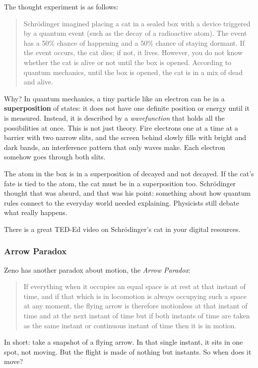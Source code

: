 The thought experiment is as follows:
\begin{quote}
    Schrödinger imagined placing a cat in a sealed box with a device triggered by a quantum event (such as the decay of a radioactive atom). The event has a 50\% chance of happening and a 50\% chance of staying dormant. If the event occurs, the cat dies; if not, it lives. However, you do not know whether the cat is alive or not until the box is opened. According to quantum mechanics, until the box is opened, the cat is in a
mix of dead and alive.
\end{quote}
Why? In quantum mechanics, a tiny particle like an electron can be in a
\textbf{superposition} of states: it does not have one definite position
or energy until it is measured. Instead, it is described by a
\emph{wavefunction} that holds all the possibilities at once. This is not
just theory. Fire electrons one at a time at a barrier with two narrow
slits, and the screen behind slowly fills with bright and dark bands, an
interference pattern that only waves make. Each electron somehow goes
through both slits.

The atom in the box is in a superposition of decayed and not decayed. If
the cat's fate is tied to the atom, the cat must be in a superposition too.
Schrödinger thought that was absurd, and that was his point: something
about how quantum rules connect to the everyday world needed explaining.
Physicists still debate what really happens. 

There is a great TED-Ed video on Schrödinger's cat in your digital
resources.

\subsubsection{Arrow Paradox}
Zeno has another paradox about motion, the \textit{Arrow Paradox}:
\begin{quote}
    If everything when it occupies an equal space is at rest at that instant of time, and if that which is in locomotion is always occupying such a space at any moment, the flying arrow is therefore motionless at that instant of time and at the next instant of time but if both instants of time are taken as the same instant or continuous instant of time then it is in motion.
\end{quote}

In short: take a snapshot of a flying arrow. In that single instant, it
sits in one spot, not moving. But the flight is made of nothing but
instants. So when does it move?

